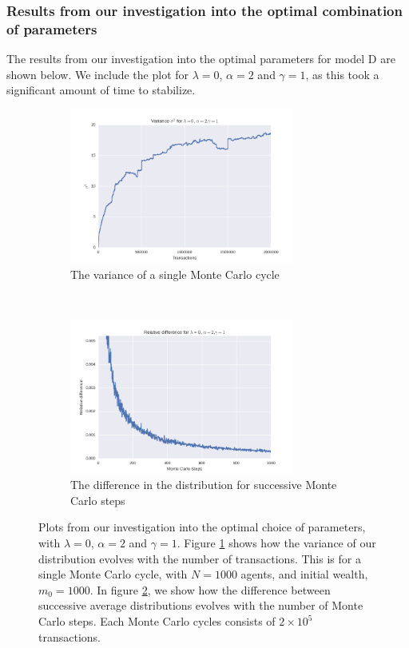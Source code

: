 \documentclass[a4paper, 10pt]{article}
\begin{document}
\subsubsection{Results from our investigation into the optimal combination of parameters}
The results from our investigation into the optimal parameters for model D are shown below. We include the plot for $\lambda = 0$, $\alpha=2$ and $\gamma=1$, as this took a significant amount of time to stabilize.
\begin{figure}[!ht]
    \centering
    \begin{subfigure}[H!]{0.5\textwidth}
        \centering
        \includegraphics[height=2.0in]{varL0A2G1.png}
        \caption{The variance of a single Monte Carlo cycle}\label{fig:ModelD_var}
    \end{subfigure}%
    ~ 
    \begin{subfigure}[H!]{0.5\textwidth}
        \centering
        \includegraphics[height=2.0in]{relDiffL0A2G1.png}
        \caption{The difference in the distribution for successive Monte Carlo steps}\label{fig:ModelD_MC_steps}
    \end{subfigure}
    \caption{Plots from our investigation into the optimal choice of parameters, with $\lambda = 0$, $\alpha=2$ and $\gamma=1$. Figure \ref{fig:ModelD_var} shows how the variance of our distribution evolves with the number of transactions. This is for a single Monte Carlo cycle, with $N=1000$ agents, and initial wealth, $m_0=1000$. In figure \ref{fig:ModelD_MC_steps}, we show how the difference between successive average distributions evolves with the number of Monte Carlo steps. Each Monte Carlo cycles consists of $2\times 10^5$ transactions.}\label{fig:ModelD_parameters}
\end{figure} %
\newpage
\end{document}
